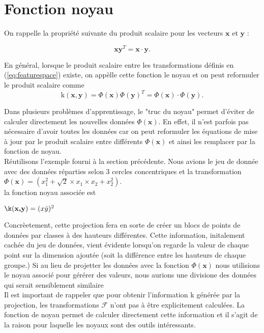 \section{Fonction noyau}\label{sec:kernel}

On rappelle la propriété suivante du produit scalaire pour les vecteurs $\textbf{x}$ et $\textbf{y}$ : 

$$\textbf{x}\textbf{y}^T = \textbf{x} \cdot \textbf{y}.$$

En général, lorsque le produit scalaire entre les transformations définis en (\ref{eq:featurespace}) existe, on appèlle cette fonction le noyau et on peut reformuler le produit scalaire comme
$$\textrm{k}(\textbf{x}, \textbf{y}) = \Phi(\textbf{x})\Phi(\textbf{y})^T = \Phi(\textbf{x})\cdot \Phi(\textbf{y}).$$

Dans plusieurs problèmes d'apprentissage, le "truc du noyau" permet d'éviter de calculer directement les nouvelles données $\Phi(\textbf{x})$. 
En effet, il n'est parfois pas nécessaire d'avoir toutes les données car on peut reformuler les équations de mise à jour par le produit scalaire 
entre différents $\Phi(\textbf{x})$ et ainsi les remplacer par la fonction de noyau. \\

Réutilisons l'exemple fourni à la section précédente. Nous avions le jeu de donnée avec des données réparties selon 3 cercles concentriques 
et la transformation $\Phi(\textbf{x})= (x_1^2 + \sqrt{2} \times x_1\times x_2 + x_2^2)$. \\ la fonction noyau associée est

$\k(\textbf{x,y})= (x \dot y)^2$

Concrèetement, cette projection fera en sorte de créer un blocs de points de données par classes à des hauteurs différentes. Cette information, 
initalement cachée du jeu de données, vient évidente lorsqu'on regarde la valeur de chaque point sur la dimension ajoutée (soit la différence entre les hauteurs de chaque groupe.)
Si au lieu de projetter les données avec la fonction $\Phi(\textbf{x})$ nous utilisions le noyau associé pour gérérer des valeurs,
nous aurions une divisione des données qui serait sensiblement similaire \\ 

Il est important de rappeler que pour obtenir l’information $\textrm{k}$ générée par la projection, les transformations $\mathcal{F}$ n'ont pas à être explicitement calculées. 
La fonction de noyau permet de calculer directement cette information et il s’agit de la raison pour laquelle les noyaux sont des outils intéressants. \\

